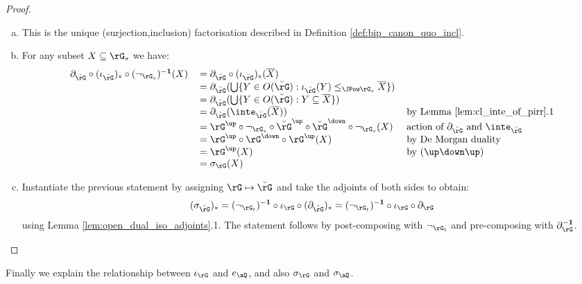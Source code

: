 \documentclass{article}
\begin{document}
\begin{proof}
\item
\begin{enumerate}[(a)]
\item
This is the unique (surjection,inclusion) factorisation described in Definition \ref{def:bip_canon_quo_incl}.

\item
For any subset $X \subseteq \rG_s$ we have:
\[
\begin{tabular}{lll}
$\partial_{\breve{\rG}} \circ (\iota_{\breve{\rG}})_* \circ (\neg_{\rG_s})^{\bf-1}(X)$
&
$= \partial_{\breve{\rG}} \circ (\iota_{\breve{\rG}})_* (\overline{X})$
\\&
$= \partial_{\breve{\rG}}(\bigcup \{ Y \in O(\breve{\rG}) : \iota_{\breve{\rG}}(Y) \leq_{\JPow \rG_s} \overline{X} \} )$
\\&
$= \partial_{\breve{\rG}}(\bigcup \{ Y \in O(\breve{\rG}) : Y \subseteq \overline{X} \} )$
\\&
$= \partial_{\breve{\rG}}(\inte_{\breve{\rG}}(\overline{X}))$
& by Lemma \ref{lem:cl_inte_of_pirr}.1
\\&
$=  \rG^\up \circ \neg_{\rG_s} \circ \breve{\rG}^\up \circ \breve{\rG}^\down \circ \neg_{\rG_s}(X)$
& action of $\partial_{\breve{\rG}}$ and $\inte_{\breve{\rG}}$
\\&
$= \rG^\up \circ \rG^\down \circ \rG^\up(X)$
& by De Morgan duality
\\&
$= \rG^\up(X)$
& by $(\up\down\up)$
\\&
$= \sigma_\rG(X)$
\end{tabular}
\]

\item
Instantiate the previous statement by assigning $\rG \mapsto \breve{\rG}$ and take the adjoints of both sides to obtain:
\[
(\sigma_{\breve{\rG}})_* 
= (\neg_{\rG_t})^{\bf-1} \circ \iota_{\rG} \circ (\partial_{\breve{\rG}})_*
= (\neg_{\rG_t})^{\bf-1} \circ \iota_{\rG} \circ \partial_{\rG}
\]
using Lemma \ref{lem:open_dual_iso_adjoints}.1. The statement follows by post-composing with $\neg_{\rG_t}$ and pre-composing with $\partial_{\rG}^{\bf-1}$.

\end{enumerate}
\end{proof}


Finally we explain the relationship between $\iota_\rG$ and $e_\aQ$, and also $\sigma_\rG$ and $\sigma_\aQ$.
\end{document}

